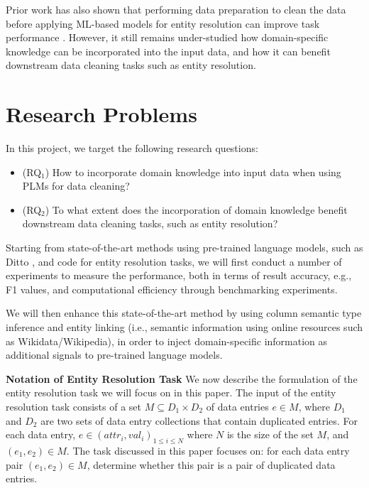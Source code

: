 Prior work has also shown that performing data preparation to clean the data before applying ML-based models for entity resolution can improve task performance \cite{koumarelas_data_2020}. However, it still remains under-studied how domain-specific knowledge can be incorporated into the input data, and how it can benefit downstream data cleaning tasks such as entity resolution.

	


\section{Research Problems}
In this project, we target the following research questions:
\begin{itemize}
    \item (RQ$_1$) How to incorporate domain knowledge into input data when using PLMs for data cleaning?
    
    \item (RQ$_2$) To what extent does the incorporation of domain knowledge benefit downstream data cleaning tasks, such as entity resolution? 
\end{itemize}


Starting from state-of-the-art methods using pre-trained language models, such as Ditto \cite{li_deep_2020}, and code for entity resolution tasks, we will first conduct a number of experiments to measure the performance, both in terms of result accuracy, e.g., F1 values, and computational efficiency through benchmarking experiments.

We will then enhance this state-of-the-art method by using column semantic type inference \cite{hulsebos_sherlock_2019} and entity linking \cite{ayoola_refined_2022} (i.e., semantic information using online resources such as Wikidata/Wikipedia), in order to inject domain-specific information as additional signals to pre-trained language models. 

\textbf{Notation of Entity Resolution Task}
We now describe the formulation of the entity resolution task we will focus on in this paper. The input of the entity resolution task consists of a set $M \subseteq D_1 \times D_2$ of data entries $e \in M$, where $D_1$ and $D_2$ are two sets of data entry collections that contain duplicated entries. 
For each data entry, $e \in {(attr_i, val_i)}_{1 \leq i \leq N}$ where $N$ is the size of the set $M$, and $(e_1, e_2) \in M$. The task discussed in this paper focuses on: for each data entry pair $(e_1, e_2) \in M$, determine whether this pair is a pair of duplicated data entries.
